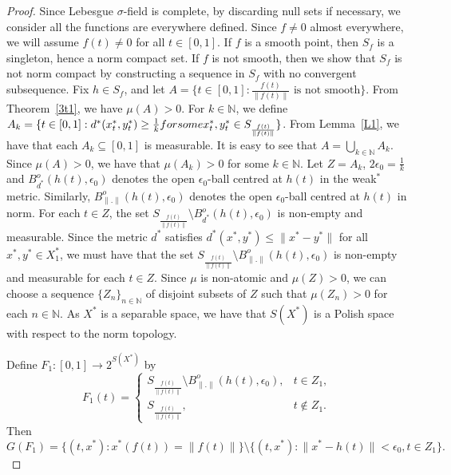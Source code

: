 \documentclass[10pt,a4paper]{amsart}
\begin{document}
\begin{proof}
 Since Lebesgue $\sigma$-field is complete, by discarding null sets if necessary, we consider all the functions are everywhere defined. Since $f\neq0$ almost everywhere, we will assume $f(t)\neq0$ for all $t\in [0,1]$. If $f$ is a smooth point, then $S_{f}$ is a singleton, hence a norm compact set. If $f$ is not smooth, then we show that $S_{f}$ is not norm compact by constructing a sequence in $S_{f}$ with no convergent subsequence. Fix $h\in S_{f}$, and let $A=\{t\in[0,1]:{\frac{f(t)}{\|f(t)\|}}\text{ is not smooth}\}$. From Theorem~\ref{3t1}, we have $\mu(A)>0$. For $k\in \mathbb{N}$, we define $A_{k}=\{t\in [0,1]:d^*(x_{t}^*, y_{t}^*)\geq \frac{1}{k}\textnormal{ for some }x_{t}^*, y_{t}^*\in S_{\frac{f(t)}{\|f(t)\|}}\}$. From Lemma~\ref{L1}, we have that each $A_{k}\subseteq [0,1]$ is measurable. It is easy to see that $A=\bigcup_{k\in \mathbb{N}}A_{k}$. Since $\mu(A)>0$, we have that $\mu(A_{k})>0$ for some $k\in \mathbb{N}$. Let $Z=A_{k}$, $2\epsilon_{0}=\frac{1}{k}$ and $B_{d^*}^{o}(h(t), \epsilon_{0})$ denotes the open $\epsilon_{0}$-ball centred at $h(t)$ in the weak$^*$ metric. Similarly, $B_{\|.\|}^{o}(h(t), \epsilon_{0})$ denotes the open $\epsilon_{0}$-ball centred at $h(t)$ in norm. For each $t\in Z$, the set $S_{\frac{f(t)}{\|f(t)\|}}\setminus B_{d^*}^{o}(h(t), \epsilon_{0})$ is non-empty and measurable. Since the metric $d^*$ satisfies $d^*(x^*,y^*)\leq \|x^*-y^*\|$ for all $x^*,y^*\in X_{1}^* $, we must have that the set $S_{\frac{f(t)}{\|f(t)\|}}\setminus B_{\|.\|}^{o}(h(t), \epsilon_{0})$ is non-empty and measurable for each $t\in Z$. Since $\mu$ is non-atomic and $\mu(Z)>0$, we can choose a sequence $\{Z_{n}\}_{n\in \mathbb{N}}$ of disjoint subsets of $Z$ such that $\mu(Z_{n})>0$ for each $n\in \mathbb{N}$. As $X^*$ is a separable space, we have that $S(X^*)$ is a Polish space with respect to the norm topology.

Define $ F_1: [0,1] \to 2^{S(X^*)} $ by
\[
F_{1}(t) =
\begin{cases} 
S_{\frac{f(t)}{\|f(t)\|}}\setminus B_{\|.\|}^{o}(h(t), \epsilon_{0}), & t \in Z_{1} , \\
S_{\frac{f(t)}{\|f(t)\|}}, & t \notin Z_{1}.
\end{cases}
\]
Then
\[
G(F_1) =\{(t,x^*):x^*(f(t))=\|f(t)\|\} \setminus \{(t,x^*):\|x^*-h(t)\|<\epsilon_{0}, t \in Z_1\}.
\]


\end{proof}
\end{document}

